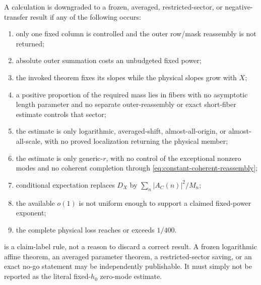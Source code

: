 \begin{definition}
\label{def:route-kill}
A calculation is downgraded to a frozen, averaged, restricted-sector,
or negative-transfer result if any of the following occurs:
\begin{enumerate}[label=\textup{(\alph*)},leftmargin=2.3em]
 \item only one fixed column is controlled and the outer row/mask
 reassembly is not returned;
 \item absolute outer summation costs an unbudgeted fixed power;
 \item the invoked theorem fixes its slopes while the physical slopes
 grow with \(X\);
 \item a positive proportion of the required mass lies in fibers with
 no asymptotic length parameter and no separate outer-reassembly or
 exact short-fiber estimate controls that sector;
 \item the estimate is only logarithmic, averaged-shift,
 almost-all-origin, or almost-all-scale, with no proved localization
 returning the physical member;
 \item the estimate is only generic-\(r\), with no control of the
 exceptional nonzero modes and no coherent completion through
 \eqref{eq:constant-coherent-reassembly};
 \item conditional expectation replaces \(D_X\) by
 \(\sum_n|A_C(n)|^2/M_n\);
 \item the available \(o(1)\) is not uniform enough to support a
 claimed fixed-power exponent;
 \item the complete physical loss reaches or exceeds \(1/400\).
\end{enumerate}
\end{definition}

\begin{remark}
 is a claim-label rule, not a reason to discard a
correct result.  A frozen logarithmic affine theorem, an averaged
parameter theorem, a restricted-sector saving, or an exact no-go
statement may be independently publishable.  It must simply not be
reported as the literal fixed-\(h_0\) zero-mode estimate.
\end{remark}
